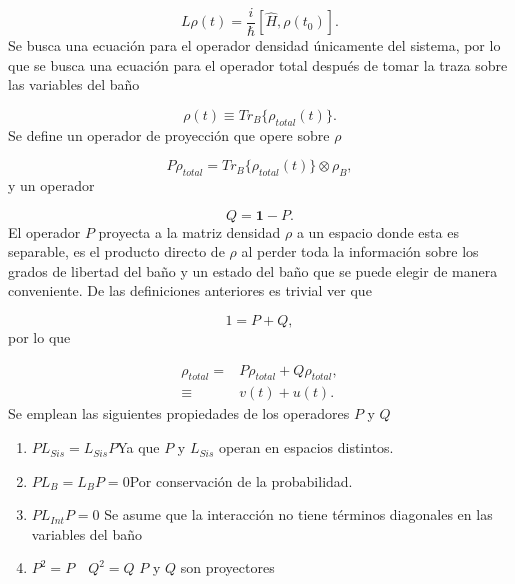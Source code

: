 \documentclass[a4paper,10pt]{report}
\begin{document}
\begin{equation}\label{defL}
L\rho(t) = \frac{i}{\hbar}[\hat{H},\rho(t_0)].
\end{equation} Se busca una ecuación para el operador densidad únicamente del sistema, por lo que se busca una ecuación para el operador total después de tomar la traza sobre las variables del baño

\begin{equation}
\rho(t) \equiv Tr_B\{\rho_{total}(t)\}.
\end{equation} Se define un operador de proyección \cite{ZollerQN} que opere sobre $ \rho $

\begin{equation}
P\rho_{total} = Tr_B\{\rho_{total}(t)\}\otimes \rho_B,
\end{equation} y un operador

\begin{equation}
Q = \mathbf{1}-P.
\end{equation} El operador $P$ proyecta a la matriz densidad $\rho$ a un espacio donde esta es separable, es el producto directo de $\rho$ al perder toda la información sobre los grados de libertad del baño y un estado del baño que se puede elegir de manera conveniente. De las definiciones anteriores es trivial ver que

\begin{equation}
1 = P + Q,
\end{equation} por lo que

\begin{align}
\rho_{total} =& P\rho_{total} + Q\rho_{total} ,\\
\equiv & v(t)+u(t).
\end{align} Se emplean las siguientes propiedades de los operadores $P$ y $Q$

\begin{enumerate}
\item $ PL_{Sis} = L_{Sis}P$\qquad Ya que $ P $ y $ L_{Sis} $ operan en espacios distintos.

\item $ PL_{B} = L_{B}P = 0 $\qquad Por conservación de la probabilidad.

\item $PL_{Int}P=0$ \qquad Se asume que la interacción no tiene términos diagonales en las variables del baño

\item $P^2 = P \quad Q^2 = Q$ \qquad $P$ y $Q$ son proyectores
\end{enumerate}
\end{document}
